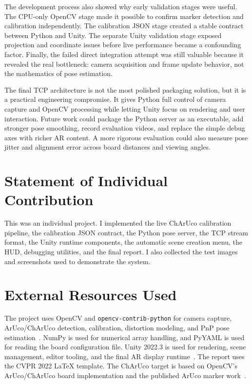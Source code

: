 \documentclass[10pt,twocolumn,letterpaper]{article}
\begin{document}
The development process also showed why early validation stages were useful.
The CPU-only OpenCV stage made it possible to confirm marker detection and
calibration independently.  The calibration JSON stage created a stable
contract between Python and Unity.  The separate Unity validation stage exposed
projection and coordinate issues before live performance became a confounding
factor.  Finally, the failed direct integration attempt was still valuable
because it revealed the real bottleneck: camera acquisition and frame update
behavior, not the mathematics of pose estimation.

The final TCP architecture is not the most polished packaging solution, but it
is a practical engineering compromise.  It gives Python full control of camera
capture and OpenCV processing while letting Unity focus on rendering and user
interaction.  Future work could package the Python server as an executable,
add stronger pose smoothing, record evaluation videos, and replace the simple
debug axes with richer AR content.  A more rigorous evaluation could also
measure pose jitter and alignment error across board distances and viewing
angles.

\section{Statement of Individual Contribution}

This was an individual project.  I implemented the live ChArUco calibration
pipeline, the calibration JSON contract, the Python pose server, the TCP stream
format, the Unity runtime components, the automatic scene creation menu, the
HUD, debugging utilities, and the final report.  I also collected the test
images and screenshots used to demonstrate the system.

\section{External Resources Used}

The project uses OpenCV and \texttt{opencv-contrib-python} for camera capture,
ArUco/ChArUco detection, calibration, distortion modeling, and PnP pose
estimation~\cite{OpenCV}.  NumPy is used for numerical array handling, and
PyYAML is used for reading the board configuration file.  Unity 2022.3 is used
for rendering, scene management, editor tooling, and the final AR display
runtime~\cite{Unity}.  The report uses the CVPR 2022 LaTeX template.  The
ChArUco target is based on OpenCV's ArUco/ChArUco board implementation and the
published ArUco marker work~\cite{GarridoJurado2014}.
\end{document}
